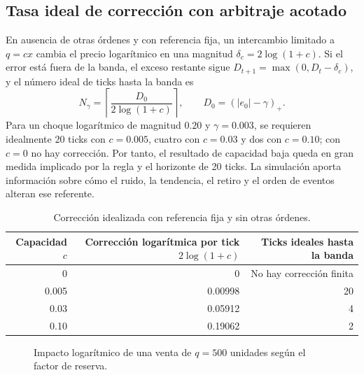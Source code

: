 \subsection{Tasa ideal de corrección con arbitraje acotado}

En ausencia de otras órdenes y con referencia fija, un intercambio limitado a $q=cx$ cambia el precio logarítmico en una magnitud $\delta_c=2\log(1+c)$. Si el error está fuera de la banda, el exceso restante sigue $D_{t+1}=\max(0,D_t-\delta_c)$, y el número ideal de ticks hasta la banda es
\[
  N_\gamma=\left\lceil\frac{D_0}{2\log(1+c)}\right\rceil,\qquad D_0=(|e_0|-\gamma)_+.
\]
Para un choque logarítmico de magnitud $0.20$ y $\gamma=0.003$, se requieren idealmente 20 ticks con $c=0.005$, cuatro con $c=0.03$ y dos con $c=0.10$; con $c=0$ no hay corrección. Por tanto, el resultado de capacidad baja queda en gran medida implicado por la regla y el horizonte de 20 ticks. La simulación aporta información sobre cómo el ruido, la tendencia, el retiro y el orden de eventos alteran ese referente.

\begin{table}[htbp]
\centering
\caption{Corrección idealizada con referencia fija y sin otras órdenes.}
\label{tab:capacity-benchmark}
\small
\begin{tabular}{@{}rrr@{}}
\toprule
Capacidad $c$ & Corrección logarítmica por tick $2\log(1+c)$ & Ticks ideales hasta la banda \\
\midrule
0 & 0 & No hay corrección finita \\
0.005 & 0.00998 & 20 \\
0.03 & 0.05912 & 4 \\
0.10 & 0.19062 & 2 \\
\bottomrule
\end{tabular}
\end{table}

\begin{figure}[htbp]
\centering
{}
\caption{Impacto logarítmico de una venta de $q=500$ unidades según el factor de reserva.}
\label{fig:impacto}
\end{figure}

